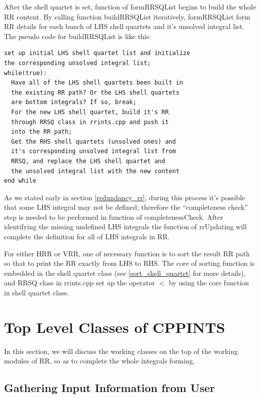 After the shell quartet is set, function of formRRSQList begins to build 
the whole RR content. By calling function buildRRSQList iteratively, 
formRRSQList form RR details for each bunch of LHS shell quartets and it's 
unsolved integral list. The pseudo code for buildRRSQList is like this:
\begin{verbatim}
set up initial LHS shell quartet list and initialize 
the corresponding unsolved integral list;
while(true):  
  Have all of the LHS shell quartets been built in
  the existing RR path? Or the LHS shell quartets
  are bottom integrals? If so, break;
  For the new LHS shell quartet, build it's RR 
  through RRSQ class in rrints.cpp and push it
  into the RR path;
  Get the RHS shell quartets (unsolved ones) and 
  it's corresponding unsolved integral list from
  RRSQ, and replace the LHS shell quartet and 
  the unsolved integral list with the new content
end while 
\end{verbatim}

As we stated early in section \ref{redundancy_rr}, during 
this process it's possible that some LHS integral may 
not be defined; therefore the ``completeness check''
step is needed to be performed in function of completenessCheck.
After identifying the missing undefined LHS integrals
the function of rrUpdating will complete the definition
for all of LHS integrals in RR.

For either HRR or VRR, one of necessary function is to sort
the result RR path so that to print the RR exactly from 
LHS to RHS. The core of sorting function is embedded in the 
shell quartet class (see \ref{sort_shell_quartet} for more 
details), and RRSQ class in rrints.cpp set up the operator
$<$ by using the core function in shell quartet class.

\section{Top Level Classes of CPPINTS}

In this section, we will discuss the working classes on the top of 
the working modules of RR, so as to complete the whole integrals
forming.

\subsection{Gathering Input Information from User}

